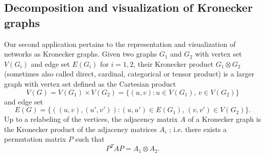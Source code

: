 \documentclass{article}
\numberwithin{equation}{section}
\theoremstyle{definition}
\begin{document}
\subsection{Decomposition and visualization of Kronecker graphs}
Our second application pertains to the representation and visualization of networks as Kronecker graphs. Given two graphs $G_1$ and $G_2$ with vertex set $V(G_i)$ and edge set $E(G_i)$ for $i=1,2$, their Kronecker product $G_1 \otimes G_2$ (sometimes also called direct, cardinal, categorical or tensor product) is a larger graph with vertex set defined as the Cartesian product 
\begin{equation*}
    V(G) = V(G_1) \times V(G_2) = \{(u,v) \colon u \in V(G_1),\, v \in V(G_2)\}
\end{equation*}
and edge set
\begin{equation*}
     E(G) = \{((u,v),(u',v')) \colon (u,u') \in E(G_1),\, (v,v') \in V(G_2)\}.
\end{equation*}
Up to a relabeling of the vertices, the adjacency matrix $A$ of a Kronecker graph is the Kronecker product of the adjacency matrices $A_i$ \cite{calderoni2021direct}; i.e. there exists a permutation matrix $P$ such that
\begin{equation*}
    P^TAP = A_1 \otimes A_2.
\end{equation*}
\end{document}
